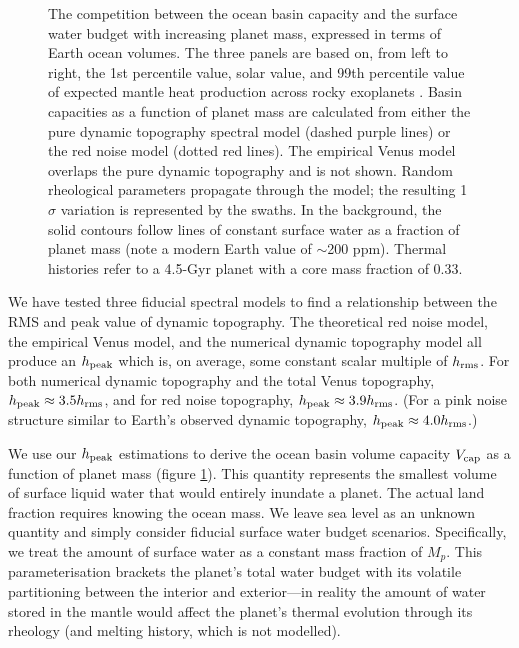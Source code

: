 \documentclass[trackchanges]{aastex63}
\begin{document}
\begin{figure}
    \centering
    \caption{The competition between the ocean basin capacity and the surface water budget with increasing planet mass, expressed in terms of Earth ocean volumes. The three panels are based on, from left to right, the 1st percentile value, solar value, and 99th percentile value of expected mantle heat production across rocky exoplanets \citep{nimmo_radiogenic_2020}. Basin capacities as a function of planet mass are calculated from either the pure dynamic topography spectral model (dashed purple lines) or the red noise model (dotted red lines). The empirical Venus model overlaps the pure dynamic topography and is not shown. Random rheological parameters propagate through the model; the resulting 1$\sigma$ variation is represented by the swaths. In the background, the solid contours follow lines of constant surface water as a fraction of planet mass (note a modern Earth value of $\sim$200 ppm). Thermal histories refer to a 4.5-Gyr planet with a core mass fraction of 0.33.}
    \label{fig:ocn-vol}
\end{figure}

We have tested three fiducial spectral models to find a relationship between the RMS and peak value of dynamic topography. The theoretical red noise model, the empirical Venus model, and the numerical dynamic topography model all produce an $h_{\rm peak}$ which is, on average, some constant scalar multiple of $h_{\rm rms}$. For both numerical dynamic topography and the total Venus topography, $h_{\rm peak} \approx 3.5 h_{\rm rms}$, and for red noise topography, $h_{\rm peak} \approx 3.9 h_{\rm rms}$. (For a pink noise structure similar to Earth's observed dynamic topography, $h_{\rm peak} \approx 4.0 h_{\rm rms}$.) 

We use our $h_{\rm peak}$ estimations to derive the ocean basin volume capacity $V_{\rm cap}$ as a function of planet mass (figure \ref{fig:ocn-vol}). This quantity represents the smallest volume of surface liquid water that would entirely inundate a planet. The actual land fraction requires knowing the ocean mass. We leave sea level as an unknown quantity and simply consider fiducial surface water budget scenarios. Specifically, we treat the amount of surface water as a constant mass fraction of $M_p$. This parameterisation brackets the planet's total water budget with its volatile partitioning between the interior and exterior---in reality the amount of water stored in the mantle would affect the planet's thermal evolution through its rheology (and melting history, which is not modelled). 
\end{document}
